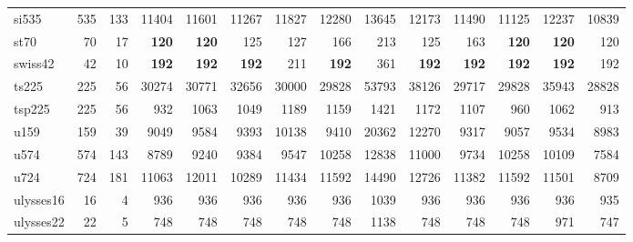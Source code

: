 {\begin{longtable}{l r r r r r r r r r r r r r}
si535 & 535 & 133 & 11404 & 11601 & 11267 & 11827 & 12280 & 13645 & 12173 & 11490 & 11125 & 12237 & 10839 \\
st70 & 70 & 17 & \textbf{120} & \textbf{120} & 125 & 127 & 166 & 213 & 125 & 163 & \textbf{120} & \textbf{120} & 120 \\
swiss42 & 42 & 10 & \textbf{192} & \textbf{192} & \textbf{192} & 211 & \textbf{192} & 361 & \textbf{192} & \textbf{192} & \textbf{192} & \textbf{192} & 192 \\
ts225 & 225 & 56 & 30274 & 30771 & 32656 & 30000 & 29828 & 53793 & 38126 & 29717 & 29828 & 35943 & 28828 \\
tsp225 & 225 & 56 & 932 & 1063 & 1049 & 1189 & 1159 & 1421 & 1172 & 1107 & 960 & 1062 & 913 \\
u159 & 159 & 39 & 9049 & 9584 & 9393 & 10138 & 9410 & 20362 & 12270 & 9317 & 9057 & 9534 & 8983 \\
u574 & 574 & 143 & 8789 & 9240 & 9384 & 9547 & 10258 & 12838 & 11000 & 9734 & 10258 & 10109 & 7584 \\
u724 & 724 & 181 & 11063 & 12011 & 10289 & 11434 & 11592 & 14490 & 12726 & 11382 & 11592 & 11501 & 8709 \\
ulysses16 & 16 & 4 & 936 & 936 & 936 & 936 & 936 & 1039 & 936 & 936 & 936 & 936 & 935 \\
ulysses22 & 22 & 5 & 748 & 748 & 748 & 748 & 748 & 1138 & 748 & 748 & 748 & 971 & 747 \\
\end{longtable}}
